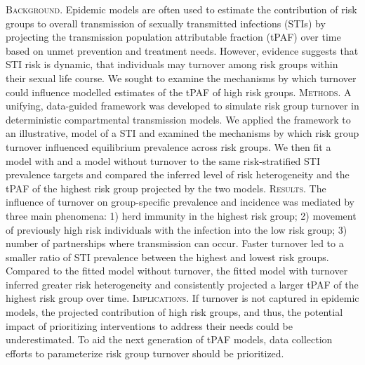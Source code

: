 \textsc{Background.}
Epidemic models are often used to estimate
the contribution of risk groups
to overall transmission of sexually transmitted infections (STIs)
by projecting the transmission population attributable fraction (tPAF) over time
based on unmet prevention and treatment needs.
However, evidence suggests that
STI risk is dynamic, that individuals may turnover among risk groups
within their sexual life course.
We sought to examine the mechanisms by which turnover could
influence modelled estimates of the tPAF of high risk groups.
\textsc{Methods.}
A unifying, data-guided framework was developed to simulate risk group turnover
in deterministic compartmental transmission models.
We applied the framework to an illustrative, model of a STI
and examined the mechanisms by which
risk group turnover influenced equilibrium prevalence across risk groups.
We then fit a model with and a model without turnover to the same
risk-stratified STI prevalence targets
and compared the inferred level of risk heterogeneity and
the tPAF of the highest risk group projected by the two models.
\textsc{Results.}
The influence of turnover on group-specific prevalence and incidence
was mediated by three main phenomena:
1) herd immunity in the highest risk group;
2) movement of previously high risk individuals with the infection into the low risk group;
3) number of partnerships where transmission can occur.
Faster turnover led to
a smaller ratio of STI prevalence between the highest and lowest risk groups.
Compared to the fitted model without turnover,
the fitted model with turnover inferred greater risk heterogeneity
and consistently projected a larger tPAF of the highest risk group over time.
\textsc{Implications.}
If turnover is not captured in epidemic models,
the projected contribution of high risk groups, and thus,
the potential impact of prioritizing interventions to address their needs could be underestimated.
To aid the next generation of tPAF models,
data collection efforts to parameterize risk group turnover should be prioritized.